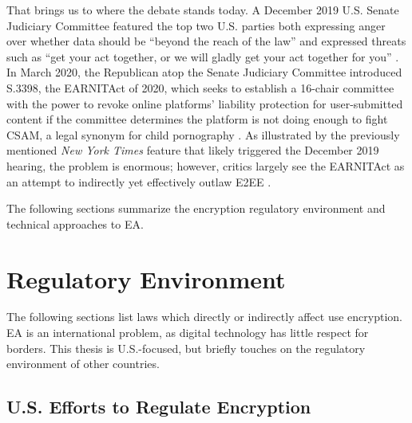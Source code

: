 That brings us to where the debate stands today. A December 2019 U.S. Senate Judiciary Committee featured the top two
U.S. parties both expressing anger over whether data should be ``beyond the reach of the law'' and expressed threats
such as ``get your act together, or we will gladly get your act together for you'' \cite{geller_2019}. In March 2020,
the Republican atop the Senate Judiciary Committee introduced S.3398, the \ac{EARNITAct} of 2020, which seeks to
establish a 16-chair committee with the power to revoke online platforms' liability protection for user-submitted
content if the committee determines the platform is not doing enough to fight \ac{CSAM}, a legal synonym for child
pornography \cite{graham_s3398_2020}. As illustrated by the previously mentioned \textit{New York Times} feature
\cite{keller_internet_2019} that likely triggered the December 2019 hearing, the problem is enormous; however, critics
largely see the \ac{EARNITAct} as an attempt to indirectly yet effectively outlaw \ac{E2EE} \cite{newman_2020}
\cite{pfefferkorn_2020}.


The following sections summarize the encryption regulatory environment and technical approaches to \ac{EA}.



\section{Regulatory Environment}
\label{sec-reg-environment}

The following sections list laws which directly or indirectly affect use encryption. \Ac{EA} is an international
problem, as digital technology has little respect for borders. This thesis is U.S.-focused, but briefly touches on the
regulatory environment of other countries.


\subsection{U.S. Efforts to Regulate Encryption}

